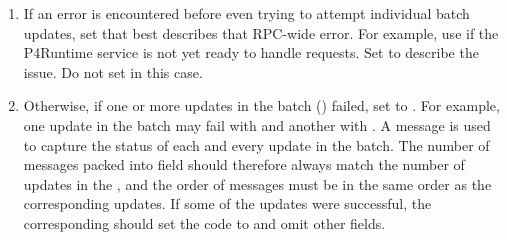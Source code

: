 \documentclass[11pt]{article}
\begin{document}
{\begin{enumerate}
\item{}
If an error is encountered before even trying to attempt individual batch
updates, set  that best describes that RPC-wide
error. For example, use  if the P4Runtime service is not yet
ready to handle requests. Set  to describe the issue. Do not
set  in this case.%

\item{}
Otherwise, if one or more updates in the batch ()
failed, set  to . For example, one update in
the batch may fail with  and another with
. A  message is used to capture the status of
each and every update in the batch. The number of  messages packed
into  field should therefore always match the
number of updates in the , and the order of
 messages must be in the same order as the corresponding
updates. If some of the updates were successful, the corresponding
 should set the code to  and omit other fields.%
\end{enumerate}%

}
\end{document}
